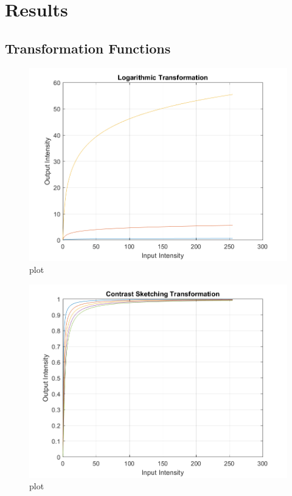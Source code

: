 \section{Results}

\subsection{Transformation Functions} 

\begin{figure}[H]
    \centering
    \includegraphics{logarithmic}
    \caption{plot}
\end{figure}

\begin{figure}[H]
    \centering
    \includegraphics{contrast_stretch}
    \caption{plot}
\end{figure}

